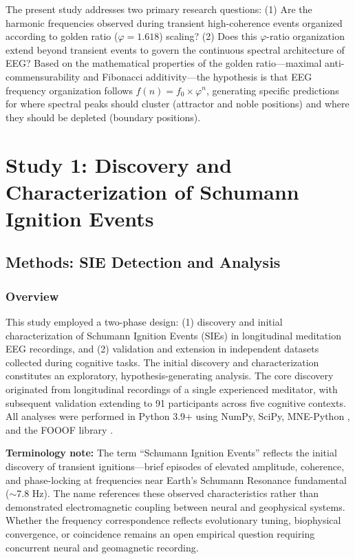 \documentclass[11pt,a4paper]{article}
\newcommand{\phisym}{\varphi}
\begin{document}
The present study addresses two primary research questions: (1) Are the harmonic frequencies observed during transient high-coherence events organized according to golden ratio ($\phisym = 1.618$) scaling? (2) Does this $\phisym$-ratio organization extend beyond transient events to govern the continuous spectral architecture of EEG? Based on the mathematical properties of the golden ratio---maximal anti-commensurability and Fibonacci additivity---the hypothesis is that EEG frequency organization follows $f(n) = f_0 \times \phisym^n$, generating specific predictions for where spectral peaks should cluster (attractor and noble positions) and where they should be depleted (boundary positions).

\section{Study 1: Discovery and Characterization of Schumann Ignition Events}

\subsection{Methods: SIE Detection and Analysis}

\subsubsection{Overview}
This study employed a two-phase design: (1) discovery and initial characterization of Schumann Ignition Events (SIEs) in longitudinal meditation EEG recordings, and (2) validation and extension in independent datasets collected during cognitive tasks. The initial discovery and characterization constitutes an exploratory, hypothesis-generating analysis. The core discovery originated from longitudinal recordings of a single experienced meditator, with subsequent validation extending to 91 participants across five cognitive contexts. All analyses were performed in Python 3.9+ using NumPy, SciPy, MNE-Python \parencite{harris2020numpy, virtanen2020scipy, gramfort2013mne}, and the FOOOF library \parencite{donoghue2020fooof}.

\textbf{Terminology note:} The term ``Schumann Ignition Events'' reflects the initial discovery of transient ignitions---brief episodes of elevated amplitude, coherence, and phase-locking at frequencies near Earth's Schumann Resonance fundamental ($\sim$7.8 Hz). The name references these observed characteristics rather than demonstrated electromagnetic coupling between neural and geophysical systems. Whether the frequency correspondence reflects evolutionary tuning, biophysical convergence, or coincidence remains an open empirical question requiring concurrent neural and geomagnetic recording.
\end{document}
